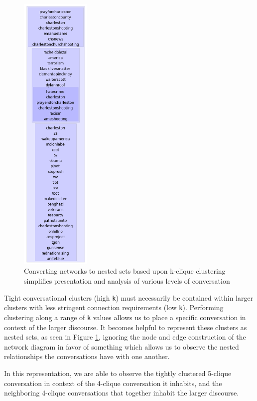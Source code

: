 \documentclass[12pt]{article}
\begin{document}
\begin{figure}[!ht]
  \centering
    \includegraphics[width=0.3\textwidth]{F5_one_column_nested_cluster.png}
    \caption{Converting networks to nested sets based  upon k-clique clustering simplifies presentation and  analysis of various levels of conversation}
  \label{fig:set_cluster}
\end{figure}

Tight conversational clusters (high \texttt{k}) must necessarily be contained within larger clusters with less stringent connection requirements (low \texttt{k}). Performing clustering along a range of \texttt{k} values allows us to place a specific conversation in context of the larger discourse. 
It becomes helpful to represent these clusters as nested sets, as seen in Figure \ref{fig:set_cluster}, ignoring the node and edge construction of the network diagram in favor of something which allows us to observe the nested relationships the conversations have with one another.
 
In this representation, we are able to observe the tightly clustered 5-clique conversation in context of the 4-clique conversation it inhabits, and the neighboring 4-clique conversations that together inhabit the larger discourse.
\end{document}
